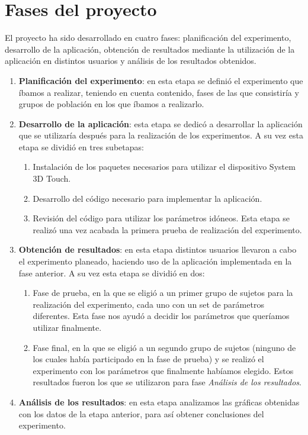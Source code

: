 \documentclass[a4paper,11pt, oneside]{book}
\begin{document}
\section{Fases del proyecto}
El proyecto ha sido desarrollado en cuatro fases: planificación del experimento, desarrollo de la aplicación, obtención de resultados mediante la utilización de la aplicación en distintos usuarios y análisis de los resultados obtenidos. 
\begin{enumerate}
	\item \textbf{Planificación del experimento}: en esta etapa se definió el experimento que íbamos a realizar, teniendo en cuenta contenido, fases de las que consistiría y grupos de población en los que íbamos a realizarlo.
	\item \textbf{Desarrollo de la aplicación}: esta etapa se dedicó a desarrollar la aplicación que se utilizaría después para la realización de los experimentos. A su vez esta etapa se dividió en tres subetapas:
	\begin{enumerate}
		\item Instalación de los paquetes necesarios para utilizar el dispositivo System 3D Touch.
		\item Desarrollo del código necesario para implementar la aplicación.
		\item Revisión del código para utilizar los parámetros idóneos. Esta etapa se realizó una vez acabada la primera prueba de realización del experimento.
	\end{enumerate}
	\item \textbf{Obtención de resultados}: en esta etapa distintos usuarios llevaron a cabo el experimento planeado, haciendo uso de la aplicación implementada en la fase anterior.
	A su vez esta etapa se dividió en dos:
	\begin{enumerate}
		\item Fase de prueba, en la que se eligió a un primer grupo de sujetos para la realización del experimento, cada uno con un set de parámetros diferentes. Esta fase nos ayudó a decidir los parámetros que queríamos utilizar finalmente.
		\item Fase final, en la que se eligió a un segundo grupo de sujetos (ninguno de los cuales había participado en la fase de prueba) y se realizó el experimento con los parámetros que finalmente habíamos elegido.
		Estos resultados fueron los que se utilizaron para fase \textit{Análisis de los resultados}.
	\end{enumerate}
		
	\item \textbf{Análisis de los resultados}: en esta etapa analizamos las gráficas obtenidas con los datos de la etapa anterior, para así obtener conclusiones del experimento.
\end{enumerate}
\end{document}
